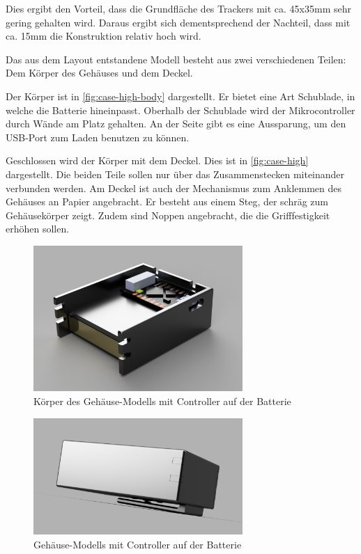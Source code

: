 Dies ergibt den Vorteil, dass die Grundfläche des Trackers mit ca. 45x35mm sehr gering gehalten wird.
Daraus ergibt sich dementsprechend der Nachteil, dass mit ca. 15mm die Konstruktion relativ hoch wird.

Das aus dem Layout entstandene Modell besteht aus zwei verschiedenen Teilen: Dem Körper des Gehäuses und dem Deckel.

Der Körper ist in \autoref{fig:case-high-body} dargestellt.
Er bietet eine Art Schublade, in welche die Batterie hineinpasst.
Oberhalb der Schublade wird der Mikrocontroller durch Wände am Platz gehalten.
An der Seite gibt es eine Aussparung, um den \gls{USB}-Port zum Laden benutzen zu können.

Geschlossen wird der Körper mit dem Deckel.
Dies ist in \autoref{fig:case-high} dargestellt.
Die beiden Teile sollen nur über das Zusammenstecken miteinander verbunden werden.
Am Deckel ist auch der Mechanismus zum Anklemmen des Gehäuses an Papier angebracht.
Er besteht aus einem Steg, der schräg zum Gehäusekörper zeigt.
Zudem sind Noppen angebracht, die die Grifffestigkeit erhöhen sollen.

\begin{figure}[htbp]
	\includegraphics[width=300px]{images/case/high_body.png}
	\centering
	\caption{Körper des Gehäuse-Modells mit Controller auf der Batterie}
	\label{fig:case-high-body}
\end{figure}

\begin{figure}[htbp]
	\includegraphics[width=300px]{images/case/high_complete.png}
	\centering
	\caption{Gehäuse-Modells mit Controller auf der Batterie}
	\label{fig:case-high}
\end{figure}

